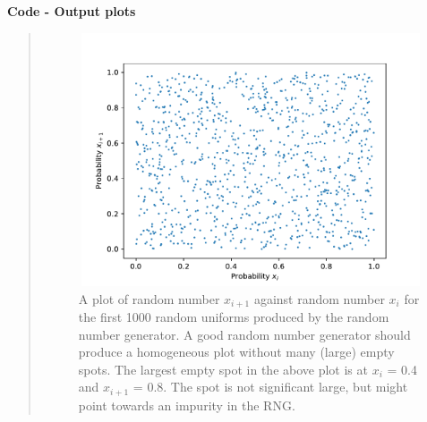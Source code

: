\textbf{Code - Output plots}
\begin{quote}

\begin{figure}[!ht]
\centering
\includegraphics[width=12cm, height=7.5cm]{./Plots/1_plot_against.pdf}
\caption{A plot of random number $x_{i+1}$ against random number  $x_{i}$ for the first 1000 random uniforms produced by the random number generator. A good random number generator should produce a homogeneous plot without many (large) empty spots. The largest empty spot in the above plot is at $x_i$ = 0.4 and $x_{i+1}$ = 0.8. The spot is not significant large, but might point towards an impurity in the RNG. }
\end{figure}


\end{quote}
